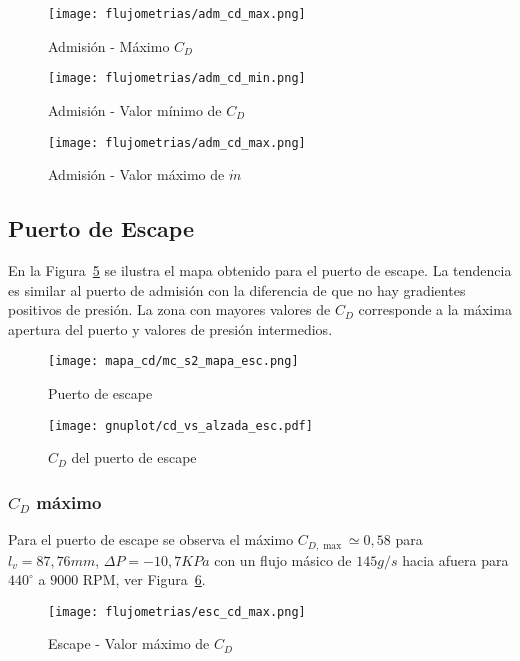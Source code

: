 \begin{figure}[h]
    \centering
    \texttt{[image: flujometrias/adm\_cd\_max.png]}
    \caption{Admisión - Máximo $C_{D}$}\label{fig:adm_cd_max}
\end{figure}

\begin{figure}[h]
    \centering
    \texttt{[image: flujometrias/adm\_cd\_min.png]}
    \caption{Admisión - Valor mínimo de $C_{D}$}\label{fig:adm_cd_min}
\end{figure}

\begin{figure}[h]
    \centering
    \texttt{[image: flujometrias/adm\_cd\_max.png]}
    \caption{Admisión - Valor máximo de $\dot{m}$}\label{fig:adm_m_max}
\end{figure}

\subsection{Puerto de Escape}
%
En la Figura~\ref{fig:mapa_cd_escape} se ilustra el mapa obtenido para el puerto
de escape.
%
La tendencia es similar al puerto de admisión con la diferencia de que no hay
gradientes positivos de presión.
%
La zona con mayores valores de $C_{D}$ corresponde a la máxima apertura del
puerto y valores de presión intermedios.
%

\begin{figure}[h]
    \centering
    \texttt{[image: mapa\_cd/mc\_s2\_mapa\_esc.png]}
    \caption{Puerto de escape}\label{fig:mapa_cd_escape}
\end{figure}

\begin{figure}[h]
    \centering
    \texttt{[image: gnuplot/cd\_vs\_alzada\_esc.pdf]}
    \caption{$C_{D}$ del puerto de escape}\label{fig:mapa_cd_escape}
\end{figure}

\subsubsection{$C_{D}$ máximo}
%
Para el puerto de escape se observa el máximo $C_{D,\max}\simeq 0,58$ para
$l_{v}=87,76 mm$, $\Delta P=-10,7 KPa$ con un flujo másico de $145 g/s$ hacia
afuera para $440^{\circ}$ a $9000$ RPM, ver Figura~\ref{fig:esc_cd_max}.

\begin{figure}[h]
    \centering
    \texttt{[image: flujometrias/esc\_cd\_max.png]}
    \caption{Escape - Valor máximo de $C_{D}$}\label{fig:esc_cd_max}
\end{figure}

